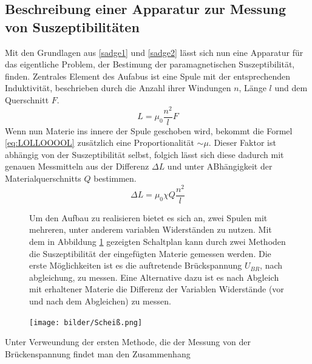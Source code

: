 \subsection{Beschreibung einer Apparatur zur Messung von Suszeptibilitäten}
Mit den Grundlagen aus \ref{sadge1} und \ref{sadge2} lässt sich nun eine Apparatur für das eigentliche Problem, der Bestimung 
der paramagnetischen Suszeptibilität, finden. 
Zentrales Element des Aufabus ist eine Spule mit der entsprechenden Induktivität, beschrieben durch die Anzahl ihrer Windungen $n$, Länge $l$
und dem Querschnitt $F$. 
\begin{equation}
    \label{eq:LOLLOOOOL}
    L = \mu_0 \frac{n^2}{l}F
\end{equation}
Wenn nun Materie ins innere der Spule geschoben wird, bekommt die Formel \eqref{eq:LOLLOOOOL} zusätzlich eine Proportionalität 
$ \sim \mu$. Dieser Faktor ist abhängig von der Suszeptibilität selbst, folgich lässt sich diese dadurch mit genauen Messmitteln aus der Differenz $\Delta L$ und unter ABhängigkeit der Materialquerschnitts $Q$
bestimmen.
\begin{equation}
    \label{eqn:werdasliestistdummXD}
    \Delta L = \mu_0 \chi Q \frac{n^2}{l}
\end{equation}
\begin{figure}
\begin{minipage}{0.5\textwidth}
Um den Aufbau zu realisieren bietet es sich an, zwei Spulen mit mehreren, unter anderem variablen Widerständen zu nutzen.
Mit dem in Abbildung \ref{fig:scheißplan} gezeigten Schaltplan kann durch zwei Methoden die Suszeptibilität der eingefügten Materie gemessen werden.
Die erste Möglichkeiten ist es die auftretende Brückspannung $U_{BR}$, nach abgleichung, zu messen. Eine Alternative dazu 
ist es nach Abgleich mit erhaltener Materie die Differenz der Variablen Widerstände (vor und nach dem Abgleichen) zu messen.
\end{minipage}
\hfill
\begin{minipage}{0.4\textwidth}
    \texttt{[image: bilder/Scheiß.png]}
    \captionsetup{justification=centering}
    \label{fig:scheißplan}
\end{minipage}
\end{figure}
Unter Verweundung der ersten Methode, die der Messung von der Brückenspannung findet man den Zusammenhang
